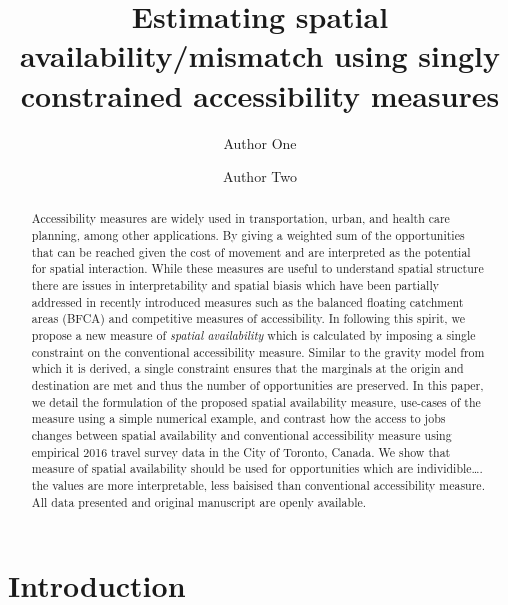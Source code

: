 \documentclass[]{elsarticle} %
\begin{document}
\begin{frontmatter}

  \title{Estimating spatial availability/mismatch using singly
constrained accessibility measures}
    \author[Some School]{Author One}
    \author[Some School]{Author Two}
      \address[Some School]{Address}
  
  \begin{abstract}
  Accessibility measures are widely used in transportation, urban, and
  health care planning, among other applications. By giving a weighted
  sum of the opportunities that can be reached given the cost of
  movement and are interpreted as the potential for spatial interaction.
  While these measures are useful to understand spatial structure there
  are issues in interpretability and spatial biasis which have been
  partially addressed in recently introduced measures such as the
  balanced floating catchment areas (BFCA) and competitive measures of
  accessibility. In following this spirit, we propose a new measure of
  \emph{spatial availability} which is calculated by imposing a single
  constraint on the conventional accessibility measure. Similar to the
  gravity model from which it is derived, a single constraint ensures
  that the marginals at the origin and destination are met and thus the
  number of opportunities are preserved. In this paper, we detail the
  formulation of the proposed spatial availability measure, use-cases of
  the measure using a simple numerical example, and contrast how the
  access to jobs changes between spatial availability and conventional
  accessibility measure using empirical 2016 travel survey data in the
  City of Toronto, Canada. We show that measure of spatial availability
  should be used for opportunities which are individible\ldots. the
  values are more interpretable, less baisised than conventional
  accessibility measure. All data presented and original manuscript are
  openly available.
  \end{abstract}
  
 \end{frontmatter}

\newpage

\hypertarget{introduction}{%
\section{Introduction}\label{introduction}}
\end{document}

